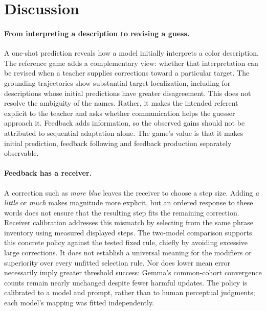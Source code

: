 \documentclass[11pt]{article}
\begin{document}
\section{Discussion}
\label{sec:discussion}
\paragraph{From interpreting a description to revising a guess.}
A one-shot prediction reveals how a model initially interprets a color
description. The reference game adds a complementary view: whether that
interpretation can be revised when a teacher supplies corrections toward
a particular target. The grounding trajectories show substantial target
localization, including for descriptions whose initial predictions have
greater disagreement. This does not resolve the ambiguity of the names.
Rather, it makes the intended referent explicit to the teacher and asks
whether communication helps the guesser approach it. Feedback adds
information, so the observed gains should not be attributed to sequential
adaptation alone. The game's value is that it makes initial prediction,
feedback following and feedback production separately observable.

\paragraph{Feedback has a receiver.}
A correction such as \textit{more blue} leaves the receiver to choose a
step size. Adding \textit{a little} or \textit{much} makes magnitude more
explicit, but an ordered response to these words does not ensure that
the resulting step fits the remaining correction. Receiver calibration
addresses this mismatch by selecting from the same phrase inventory using
measured displayed steps. The two-model comparison supports this concrete
policy against the tested fixed rule, chiefly by avoiding excessive large
corrections. It does not establish a universal meaning for the modifiers
or superiority over every unfitted selection rule. Nor does lower mean
error necessarily imply greater threshold success: Gemma's common-cohort
convergence counts remain nearly unchanged despite fewer harmful updates.
The policy is calibrated to a model and prompt, rather than to human
perceptual judgments; each model's mapping was fitted independently.
\end{document}
